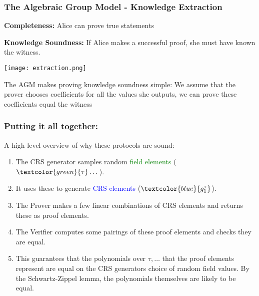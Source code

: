 \documentclass{beamer}
\begin{document}
\begin{frame}
    
    \frametitle{The Algebraic Group Model - Knowledge Extraction}

    \textbf{Completeness:} Alice can prove true statements
    

    \textbf{Knowledge Soundness:} If Alice makes a successful proof, she must have known the witness.
    

    \begin{center}
        \texttt{[image: extraction.png]}        
    \end{center}


    The AGM makes proving knowledge soundness simple: We assume that the prover chooses coefficients for all the values she outputs, we can prove these coefficients equal the witness

\end{frame}

\begin{frame}
    
    \frametitle{Putting it all together:}

    A high-level overview of why these protocols are sound:

    \begin{enumerate}
        \item The CRS generator samples random \textcolor{green}{field elements} ($\textcolor{green}{\tau} \dots$).
        \item It uses these to generate \textcolor{blue}{CRS elements} ($\textcolor{blue}{g_1^{\tau}}$).
        \item The Prover makes a few linear combinations of CRS elements and returns these as proof elements.
        \item The Verifier computes some pairings of these proof elements and checks they are equal.
        \item This guarantees that the polynomials over $\tau, \dots$ that the proof elements represent are equal on the CRS generators choice of random field values. By the Schwartz-Zippel lemma, the polynomials themselves are likely to be equal.
    \end{enumerate}



    
    

\end{frame}
\end{document}
